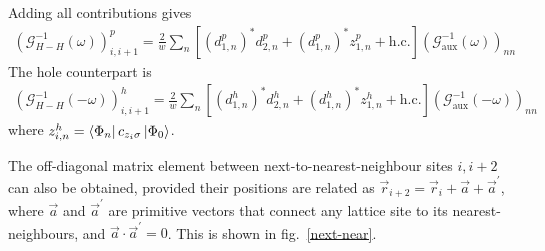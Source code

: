 \documentclass[10pt]{report}
\numberwithin{equation}{section}
\begin{document}
Adding all contributions gives
\begin{equation}\begin{aligned}
	\left(\mathcal{G}^{-1}_{H-H}\left(\omega\right) \right)^p_{i,i+1} = \frac{2}{w} \sum_n \left[\left(d^p_{1,n}\right)^*d^p_{2,n} + \left(d^p_{1,n}\right)^* z^p_{1,n} + \text{h.c.}\right] \left(\mathcal{G}^{-1}_\text{aux}(\omega) \right)_{nn}
\end{aligned}\end{equation}
The hole counterpart is
\begin{equation}\begin{aligned}
	\left(\mathcal{G}^{-1}_{H-H}\left(-\omega\right) \right)^h_{i,i+1} = \frac{2}{w} \sum_n \left[\left(d^h_{1,n}\right)^*d^h_{2,n} + \left(d^h_{1,n}\right)^* z^h_{1,n} + \text{h.c.}\right] \left(\mathcal{G}^{-1}_\text{aux}(-\omega) \right)_{nn}
\end{aligned}\end{equation}
where \(z^h_{i,n} = \bra{\Phi_n}c_{z_i\sigma}\ket{\Phi_0}\).

The off-diagonal matrix element between next-to-nearest-neighbour sites \(i,i+2\) can also be obtained, provided their positions are related as \(\vec r_{i+2} = \vec r_i + \vec a + \vec a^\prime\), where \(\vec a\) and \(\vec a^\prime\) are primitive vectors that connect any lattice site to its nearest-neighbours, and \(\vec{a}\cdot\vec{a}^\prime = 0\). This is shown in fig.~\ref{next-near}. 
\end{document}
